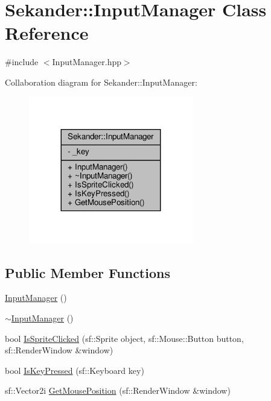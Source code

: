 \hypertarget{classSekander_1_1InputManager}{}\section{Sekander\+:\+:Input\+Manager Class Reference}
\label{classSekander_1_1InputManager}


{\ttfamily \#include $<$Input\+Manager.\+hpp$>$}



Collaboration diagram for Sekander\+:\+:Input\+Manager\+:
\nopagebreak
\begin{figure}[H]
\begin{center}
\leavevmode
\includegraphics[width=203pt]{classSekander_1_1InputManager__coll__graph}
\end{center}
\end{figure}
\subsection*{Public Member Functions}
\begin{DoxyCompactItemize}
\item 
\hyperlink{classSekander_1_1InputManager_ab171e3428df1026155f91bbb49fe5a4a}{Input\+Manager} ()
\item 
\hyperlink{classSekander_1_1InputManager_ade61718adb0fa9db1a428e3ce6332542}{$\sim$\+Input\+Manager} ()
\item 
bool \hyperlink{classSekander_1_1InputManager_a45b7707b3c38d463a9624624a903a35a}{Is\+Sprite\+Clicked} (sf\+::\+Sprite object, sf\+::\+Mouse\+::\+Button button, sf\+::\+Render\+Window \&window)
\item 
bool \hyperlink{classSekander_1_1InputManager_a66707c739a6e5abc424aba01e6188eef}{Is\+Key\+Pressed} (sf\+::\+Keyboard key)
\item 
sf\+::\+Vector2i \hyperlink{classSekander_1_1InputManager_a6e246fd32b5006e4e5097bbf9dcaea4c}{Get\+Mouse\+Position} (sf\+::\+Render\+Window \&window)
\end{DoxyCompactItemize}
